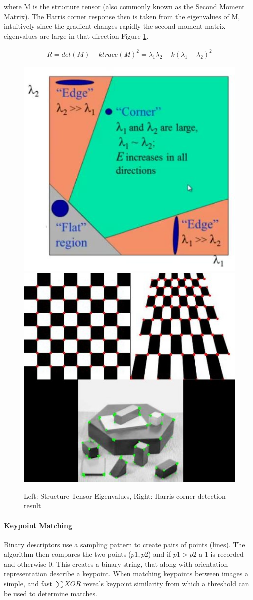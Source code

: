 \documentclass[11pt,twoside]{report}
\begin{document}
where M is the structure tensor (also commonly known as the Second Moment Matrix). The Harris corner response then is taken from the eigenvalues of M, intuitively since the gradient changes rapidly the second moment matrix eigenvalues are large in that direction Figure \ref{Harris}.


\begin{equation}
\begin{aligned}
R = det(M) - \mathit{k}trace(M)^{2} = \lambda_{1}\lambda_{2} - \mathit{k}(\lambda_{1} + \lambda_{2})^{2}
\end{aligned}
\end{equation}

\noindent \begin{figure}[H] 
	\includegraphics[width = 0.5\hsize]{figures/harris_region.jpg}
	\includegraphics[width = 0.45\hsize]{figures/harris_result.jpg}
	\caption{Left: Structure Tensor Eigenvalues, Right: Harris corner detection result \cite{opencv_harris_article} }
	\label{Harris}
\end{figure}

\paragraph{Keypoint Matching}
Binary descriptors use a sampling pattern to create pairs of points (lines). The algorithm then compares the two points ($p1,p2$) and if $p1 > p2$ a 1 is recorded and otherwise 0. This creates a binary string, that along with orientation representation describe a keypoint. When matching keypoints between images a simple, and fast $\sum XOR$ reveals keypoint similarity from which a threshold can be used to determine matches.
\end{document}
